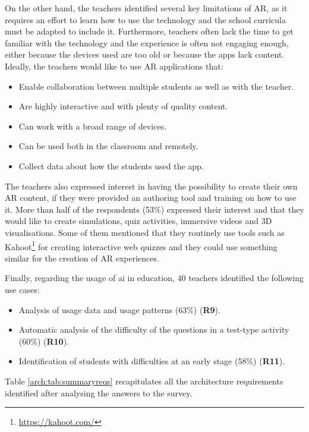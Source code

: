 On the other hand, the teachers identified several key limitations of AR, as it requires an effort to learn how to use the technology and the school curricula must be adapted to include it. Furthermore, teachers often lack the time to get familiar with the technology and the experience is often not engaging enough, either because the devices used are too old or because the apps lack content. Ideally, the teachers would like to use AR applications that:
\begin{itemize}
        \item Enable collaboration between multiple students as well as with the teacher.
        \item Are highly interactive and with plenty of quality content.
        \item Can work with a broad range of devices.
        \item Can be used both in the classroom and remotely.
        \item Collect data about how the students used the app.
\end{itemize}

The teachers also expressed interest in having the possibility to create their own AR content, if they were provided an authoring tool and training on how to use it. More than half of the respondents (53\%) expressed their interest and that they would like to create simulations, quiz activities, immersive videos and 3D visualisations. Some of them mentioned that they routinely use tools such as Kahoot\footnote{\url{https://kahoot.com/}} for creating interactive web quizzes and they could use something similar for the creation of AR experiences.

Finally, regarding the usage of \gls{ai} in education, 40 teachers identified the following use cases:
\begin{itemize}
        \item Analysis of usage data and usage patterns (63\%) (\textbf{R9}).
        \item Automatic analysis of the difficulty of the questions in a test-type activity (60\%) (\textbf{R10}).
        \item Identification of students with difficulties at an early stage (58\%) (\textbf{R11}).
\end{itemize}

Table \ref{arch:tab:summaryreqs} recapitulates all the architecture requirements identified after analysing the answers to the survey.


